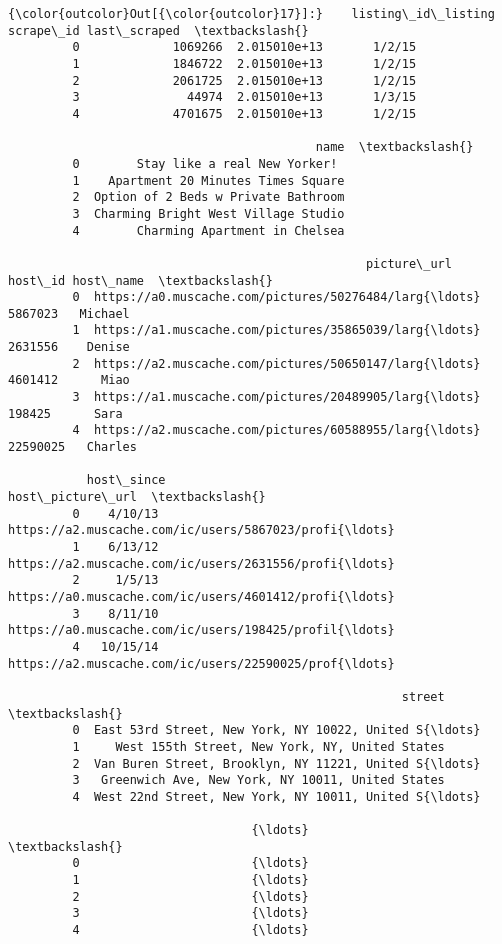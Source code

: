 \documentclass[11pt]{article}
\begin{document}
            \begin{Verbatim}[commandchars=\\\{\}]
{\color{outcolor}Out[{\color{outcolor}17}]:}    listing\_id\_listing     scrape\_id last\_scraped  \textbackslash{}
         0             1069266  2.015010e+13       1/2/15   
         1             1846722  2.015010e+13       1/2/15   
         2             2061725  2.015010e+13       1/2/15   
         3               44974  2.015010e+13       1/3/15   
         4             4701675  2.015010e+13       1/2/15   
         
                                           name  \textbackslash{}
         0        Stay like a real New Yorker!    
         1    Apartment 20 Minutes Times Square   
         2  Option of 2 Beds w Private Bathroom   
         3  Charming Bright West Village Studio   
         4        Charming Apartment in Chelsea   
         
                                                  picture\_url   host\_id host\_name  \textbackslash{}
         0  https://a0.muscache.com/pictures/50276484/larg{\ldots}   5867023   Michael   
         1  https://a1.muscache.com/pictures/35865039/larg{\ldots}   2631556    Denise   
         2  https://a2.muscache.com/pictures/50650147/larg{\ldots}   4601412      Miao   
         3  https://a1.muscache.com/pictures/20489905/larg{\ldots}    198425      Sara   
         4  https://a2.muscache.com/pictures/60588955/larg{\ldots}  22590025   Charles   
         
           host\_since                                   host\_picture\_url  \textbackslash{}
         0    4/10/13  https://a2.muscache.com/ic/users/5867023/profi{\ldots}   
         1    6/13/12  https://a2.muscache.com/ic/users/2631556/profi{\ldots}   
         2     1/5/13  https://a0.muscache.com/ic/users/4601412/profi{\ldots}   
         3    8/11/10  https://a0.muscache.com/ic/users/198425/profil{\ldots}   
         4   10/15/14  https://a2.muscache.com/ic/users/22590025/prof{\ldots}   
         
                                                       street  \textbackslash{}
         0  East 53rd Street, New York, NY 10022, United S{\ldots}   
         1     West 155th Street, New York, NY, United States   
         2  Van Buren Street, Brooklyn, NY 11221, United S{\ldots}   
         3   Greenwich Ave, New York, NY 10011, United States   
         4  West 22nd Street, New York, NY 10011, United S{\ldots}   
         
                                  {\ldots}                          \textbackslash{}
         0                        {\ldots}                           
         1                        {\ldots}                           
         2                        {\ldots}                           
         3                        {\ldots}                           
         4                        {\ldots}                           
         

\end{Verbatim}
\end{document}
